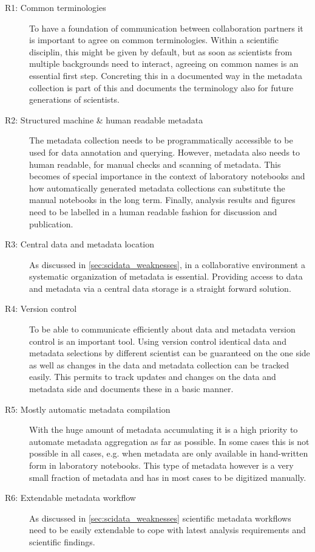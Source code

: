 \begin{description}
 \item[R1: Common terminologies] To have a foundation of communication between collaboration partners it is important to agree on common terminologies. Within a scientific disciplin, this might be given by default, but as soon as scientists from multiple backgrounds need to interact, agreeing on common names is an essential first step. Concreting this in a documented way in the metadata collection is part of this and documents the terminology also for future generations of scientists.
 \item[R2: Structured machine \& human readable metadata] The metadata collection needs to be programmatically accessible to be used for data annotation and querying. However, metadata also needs to human readable, for manual checks and scanning of metadata. This becomes of special importance in the context of laboratory notebooks and how automatically generated metadata collections can substitute the manual notebooks in the long term. Finally, analysis results and figures need to be labelled in a human readable fashion for discussion and publication.
 \item[R3: Central data and metadata location] As discussed in \cref{sec:scidata_weaknesses}, in a collaborative environment a systematic organization of metadata is essential. Providing access to data and metadata via a central data storage is a straight forward solution. 
 \item[R4: Version control] To be able to communicate efficiently about data and metadata version control is an important tool. Using version control identical data and metadata selections by different scientist can be guaranteed on the one side as well as changes in the data and metadata collection can be tracked easily. This permits to track updates and changes on the data and metadata side and documents these in a basic manner.
 \item[R5: Mostly automatic metadata compilation] With the huge amount of metadata accumulating it is a high priority to automate metadata aggregation as far as possible. In some cases this is not possible in all cases, e.g. when metadata are only available in hand-written form in laboratory notebooks. This type of metadata however is a very small fraction of metadata and has in most cases to be digitized manually.
 \item[R6: Extendable metadata workflow] As discussed in \cref{sec:scidata_weaknesses} scientific metadata workflows need to be easily extendable to cope with latest analysis requirements and scientific findings.

\end{description}
